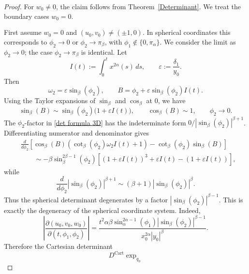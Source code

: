 \documentclass[10pt,a4paper]{amsart}
\begin{document}
\begin{proof}
    For \(w_0\neq0\), the claim follows from Theorem~\ref{Determinant}. We treat the boundary
    cases \(w_0=0\).

    First assume \(w_0=0\) and \((u_0,v_0)\neq(\pm1,0)\). In spherical coordinates this
    corresponds to \(\phi_2\to0\) or \(\phi_2\to\pi_\beta\), with
    \(\phi_1\notin\{0,\pi_\alpha\}\). We consider the limit as \(\phi_2\to0\); the case
    \(\phi_2\to\pi_\beta\) is identical. Let
    \[
        I(t):=\int_0^t x^{2\alpha}(s)\,ds,
        \qquad
        \varepsilon:=\frac{\delta_1}{y_0}.
    \]
    Then
    \[
        \omega_2=\varepsilon\sin_\beta(\phi_2),
        \qquad
        B=\phi_2+\varepsilon\sin_\beta(\phi_2)I(t).
    \]
    Using the Taylor expansions of \(\sin_\beta\) and \(\cos_\beta\) at \(0\), we have
    \[
        \sin_\beta(B)
        \sim
        \sin_\beta(\phi_2)\bigl(1+\varepsilon I(t)\bigr),
        \qquad
        \cos_\beta(B)\sim 1,
        \qquad
        \phi_2\to0.
    \]
    The \(\phi_2\)-factor in \eqref{det formula 3D} has the indeterminate form
    \(0/|\sin_\beta(\phi_2)|^{\beta+1}\). Differentiating numerator and denominator gives
    \[
        \begin{aligned}
             & \frac{d}{d\phi_2}
            \left[
                \cos_\beta(B)
                \left(\cot_\beta(\phi_2)\omega_2 I(t)+1\right)
                -
                \cot_\beta(\phi_2)\sin_\beta(B)
                \right]
            \\
             & \qquad\sim
            -\beta\sin_\beta^{2\beta-1}(\phi_2)
            \left[
                (1+\varepsilon I(t))^3
                +
                \varepsilon I(t)
                -
                (1+\varepsilon I(t))
                \right],
        \end{aligned}
    \]
    while
    \[
        \frac{d}{d\phi_2}
        |\sin_\beta(\phi_2)|^{\beta+1}
        \sim
        (\beta+1)|\sin_\beta(\phi_2)|^\beta .
    \]
    Thus the spherical determinant degenerates by a factor
    \(|\sin_\beta(\phi_2)|^{\beta-1}\). This is exactly the degeneracy of the spherical
    coordinate system. Indeed,
    \[
        \left|
        \frac{\partial(u_0,v_0,w_0)}
        {\partial(t,\phi_1,\phi_2)}
        \right|
        =
        \frac{
            t^2\alpha\beta
            \sin_\alpha^{2\alpha-1}(\phi_1)
            |\sin_\beta(\phi_2)|^{\beta-1}
        }{
            x_0^{2\alpha}|y_0|^\beta
        }.
    \]
    Therefore the Cartesian determinant
    \[
        D^{\operatorname{Cart}}\exp_{q_0}
\]
\end{proof}
\end{document}
